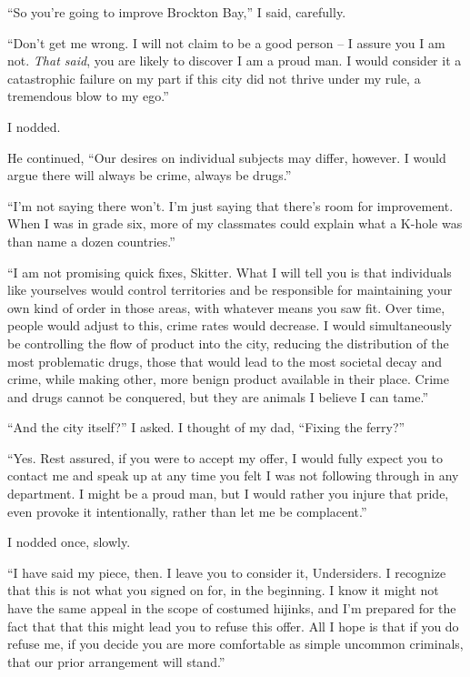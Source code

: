 ``So you're going to improve Brockton Bay,'' I said, carefully.



``Don't get me wrong.  I will not claim to be a good person – I assure you I am not.  \emph{That said}, you are likely to discover I am a proud man.  I would consider it a catastrophic failure on my part if this city did not thrive under my rule, a tremendous blow to my ego.''



I nodded.



He continued, ``Our desires on individual subjects may differ, however.  I would argue there will always be crime, always be drugs.''



``I'm not saying there won't.  I'm just saying that there's room for improvement.  When I was in grade six, more of my classmates could explain what a K-hole was than name a dozen countries.''



``I am not promising quick fixes, Skitter.  What I will tell you is that individuals like yourselves would control territories and be responsible for maintaining your own kind of order in those areas, with whatever means you saw fit.  Over time, people would adjust to this, crime rates would decrease.  I would simultaneously be controlling the flow of product into the city, reducing the distribution of the most problematic drugs, those that would lead to the most societal decay and crime, while making other, more benign product available in their place.  Crime and drugs cannot be conquered, but they are animals I believe I can tame.''



``And the city itself?'' I asked.  I thought of my dad, ``Fixing the ferry?''



``Yes.  Rest assured, if you were to accept my offer, I would fully expect you to contact me and speak up at any time you felt I was not following through in any department.  I might be a proud man, but I would rather you injure that pride, even provoke it intentionally, rather than let me be complacent.''



I nodded once, slowly.



``I have said my piece, then.  I leave you to consider it, Undersiders.  I recognize that this is not what you signed on for, in the beginning.  I know it might not have the same appeal in the scope of costumed hijinks, and I'm prepared for the fact that that this might lead you to refuse this offer.  All I hope is that if you do refuse me, if you decide you are more comfortable as simple uncommon criminals, that our prior arrangement will stand.''



